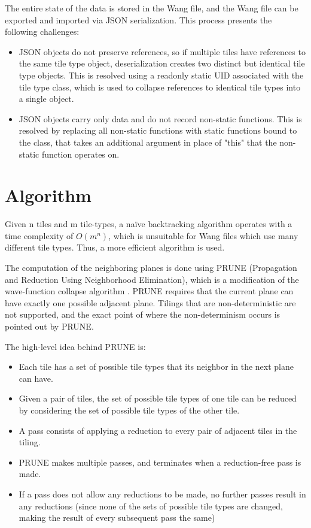 \documentclass[letterpaper,11pt]{article}
\begin{document}
The entire state of the data is stored in the Wang file, and the Wang file can be exported and imported via JSON \cite{json} serialization. This process presents the following challenges:


\begin{itemize}
	\item JSON objects do not preserve references, so if multiple tiles have references to the same tile type object, deserialization creates two distinct but identical tile type objects. This is resolved using a readonly static UID associated with the tile type class, which is used to collapse references to identical tile types into a single object. 
	\item JSON objects carry only data and do not record non-static functions. This is resolved by replacing all non-static functions with static functions bound to the class, that takes an additional argument in place of "this" that the non-static function operates on.
	
\end{itemize}

\section*{Algorithm}

Given n tiles and m tile-types, a naïve backtracking algorithm operates with a time complexity of $O(m^n)$, which is unsuitable for Wang files which use many different tile types. Thus, a more efficient algorithm is used.

The computation of the neighboring planes is done using PRUNE (Propagation and Reduction Using Neighborhood Elimination), which is a modification of the wave-function collapse algorithm \cite{Merrel}. PRUNE requires that the current plane can have exactly one possible adjacent plane. Tilings that are non-deterministic are not supported, and the exact point of where the non-determinism occurs is pointed out by PRUNE.

The high-level idea behind PRUNE is:

\begin{itemize}
	\item Each tile has a set of possible tile types that its neighbor in the next plane can have.
	\item Given a pair of tiles, the set of possible tile types of one tile can be reduced by considering the set of possible tile types of the other tile.
	\item A pass consists of applying a reduction to every pair of adjacent tiles in the tiling.
	\item PRUNE makes multiple passes, and terminates when a reduction-free pass is made.
	\item If a pass does not allow any reductions to be made, no further passes result in any reductions (since none of the sets of possible tile types are changed, making the result of every subsequent pass the same)
\end{itemize}
\end{document}

